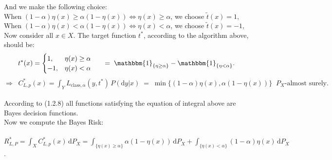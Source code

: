 \documentclass{article}
\begin{document}
And we make the following choice:\\
When $(1-\alpha)\eta(x) \geq \alpha(1-\eta(x)) \Leftrightarrow \eta(x) \geq \alpha$, we choose $\tilde{t}(x) = 1$,\\
When $(1-\alpha)\eta(x) < \alpha(1-\eta(x)) \Leftrightarrow \eta(x) < \alpha$, we choose $\tilde{t}(x) = -1$,\\
Now consider all $x\in X$. The target function $t^*$, according to the algorithm above, should be:
\begin{align*}
t^*(x) = \begin{cases} 1, &\eta(x) \geq \alpha \cr -1, &\eta(x) < \alpha \end{cases} 
\indent = \; \mathbbm{1}_{\{\eta \geq \alpha\}} - \mathbbm{1}_{\{\eta < \alpha\}}.
\end{align*}
$\Rightarrow \;\; C^*_{L,p}(x) = \displaystyle{ \int_{Y}  L_{\text{class},\alpha}(y,t^*)\,  P(\text{d}y|x)} \;=\; \min \{ (1-\alpha)\eta(x), \alpha(1-\eta(x)) \}\;\; P_X\text{-almost surely}.$\\
\vspace*{-1em}\\
According to (1.2.8) all functions satisfying the equation of integral above are  Bayes decision functions.\\
Now we compute the Bayes Risk:\\
\vspace*{-1em}\\
$R^*_{L,P} =  \displaystyle{ \int_{X} C^*_{L,p}(x)\, \text{d}P_X = \int_{\{\eta(x)\geq \alpha\}}\alpha(1-\eta(x))\, \text{d}P_X + \int_{\{\eta(x) < \alpha\}} (1-\alpha)\eta(x)\, \text{d}P_X } $.\\
 \\

\newpage
\end{document}
